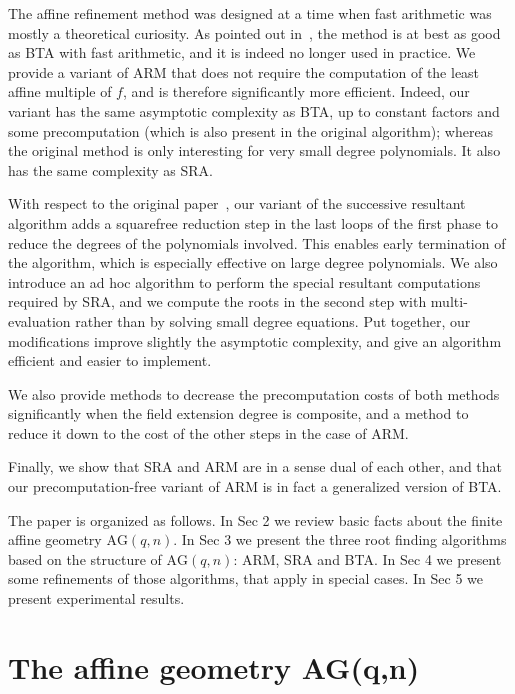 \documentclass{sig-alternate}
\newcommand{\qq}{q}
\newcommand{\nn}{n}
\newcommand{\AG}{\mathrm{AG}(\qq,\nn)}
\newcounter{algo}
\renewcommand{\paragraph}[1]{\smallskip\noindent{{\bf \rm #1.}}}
\begin{document}
The affine refinement method was designed at a time when fast arithmetic was mostly a theoretical curiosity. As pointed out in~\cite{cgUCL-P14}, the method is at best as good as BTA with fast arithmetic, and it is indeed no longer used in practice. We provide a variant of ARM that does not require the computation of the least affine multiple of $f$, and is therefore significantly more efficient. Indeed, our variant  has the same asymptotic complexity as BTA, up to constant factors and some precomputation (which is also present in the original algorithm); whereas the original method is only interesting for very small degree polynomials. It also has the same complexity as SRA.

With respect to the original paper~\cite{cgUCL-P14}, our variant of the successive resultant algorithm adds a squarefree reduction step in the last loops of the first phase to reduce the degrees of the polynomials involved. This enables early termination of the algorithm, which is especially effective on large degree polynomials. We also introduce an ad hoc algorithm to perform the special resultant computations required by SRA, and we compute the roots in the second step with multi-evaluation rather than by solving small degree equations. Put together, our modifications improve slightly the asymptotic complexity, and give an algorithm efficient and easier to implement.

We also provide methods to decrease the precomputation costs of both methods significantly when the field extension degree is composite, and a method to reduce it down to the cost of the other steps in the case of ARM.

Finally, we show that SRA and ARM are in a sense dual of each other, and that our precomputation-free variant of ARM is in fact a generalized version of BTA.

\paragraph{Outline}
The paper is organized as follows. In Sec 2 we review basic facts
about the finite affine geometry $\AG$. In Sec 3 we present the three
root finding algorithms based on the structure of $\AG$: ARM, SRA and
BTA. In Sec 4 we present some refinements of those algorithms, that
apply in special cases. In Sec 5 we present experimental
results.


\section{The affine geometry AG(\qq,\nn)}
\label{sec:nsd}
\end{document}
